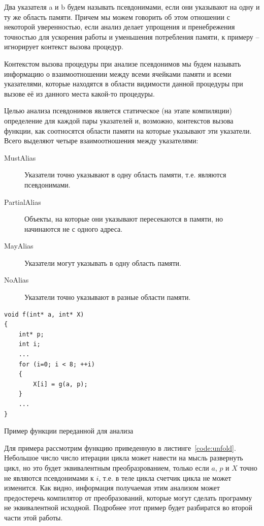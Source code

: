 \begin{mydefinition}
Два указателя a и b будем называть псевдонимами, если они указывают на одну и ту же область памяти. Причем мы можем говорить об этом отношении с некоторой уверенностью, если анализ делает упрощения и пренебрежения точностью для ускорения работы и уменьшения потребления памяти, к примеру -- игнорирует контекст вызова процедур.
\end{mydefinition}

\begin{mydefinition}
Контекстом вызова процедуры при анализе псевдонимов мы будем называть информацию о взаимоотношении между всеми ячейками памяти и всеми указателями, которые находятся в области видимости данной процедуры при вызове её из данного места какой-то процедуры. 
\end{mydefinition}

Целью анализа псевдонимов является статическое (на этапе компиляции) определение для каждой пары указателей и, возможно, контекстов вызова функции, как соотносятся области памяти на которые указывают эти указатели. Всего выделяют четыре взаимоотношения между указателями:
\begin{description}
  \item[MustAlias] Указатели точно указывают в одну область памяти, т.е. являются псевдонимами.
  \item[PartialAlias] Объекты, на которые они указывают пересекаются в памяти, но начинаются не с одного адреса.
  \item[MayAlias] Указатели могут указывать в одну область памяти.
  \item[NoAlias] Указатели точно указывают в разные области памяти.
\end{description}

\begin{ListingEnv}[H]
\begin{lstlisting}
void f(int* a, int* X)
{
    int* p;
    int i;
    ...
    for (i=0; i < 8; ++i)
    {
        X[i] = g(a, p);
    }
    ...
}
\end{lstlisting}
\caption{Пример функции переданной для анализа}
\label{code:unfold}
\end{ListingEnv}

\begin{myexample}
Для примера рассмотрим функцию приведенную в листинге~\ref{code:unfold}. Небольшое число число итерации цикла может навести на мысль развернуть цикл, но это будет эквивалентным преобразрованием, только если $a$, $p$ и $X$ точно не являются псевдонимами к $i$, т.е. в теле цикла счетчик цикла не может изменится. Как видно, информация получаемая этим анализом может предостеречь компилятор от преобразований, которые могут сделать программу не эквивалентной исходной. Подробнее этот пример будет разбиратся во второй части этой работы.
\label{ex:unfold}
\end{myexample}

